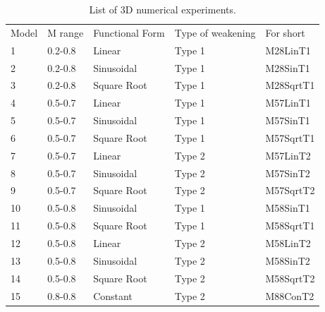 \documentclass[draft,gc]{agutex}
\begin{document}
\begin{table}
\caption{List of 3D numerical experiments.}
\centering
\begin{tabular}{l l l l l}
\hline
Model& M range & Functional Form & Type of weakening & For short \\ 
1    &  0.2-0.8    &   Linear        & Type 1   &  M28LinT1\\
2    &  0.2-0.8    &   Sinusoidal    & Type 1   &  M28SinT1\\
3    &  0.2-0.8    &   Square Root   & Type 1   &  M28SqrtT1 \\
4    &  0.5-0.7    &   Linear        & Type 1   &  M57LinT1 \\
5    &  0.5-0.7    &   Sinusoidal    & Type 1   &  M57SinT1 \\
6    &  0.5-0.7    &   Square Root    & Type 1   &  M57SqrtT1 \\
7    &  0.5-0.7    &   Linear       & Type 2   &  M57LinT2 \\
8    &  0.5-0.7    &   Sinusoidal    & Type 2   &  M57SinT2 \\
9    &  0.5-0.7    &   Square Root   & Type 2   &  M57SqrtT2  \\
10    &  0.5-0.8    &   Sinusoidal    & Type 1   &  M58SinT1  \\
11   &  0.5-0.8    &   Square Root   & Type 1   &  M58SqrtT1   \\
12    &  0.5-0.8    &   Linear        & Type 2   &  M58LinT2   \\
13    &  0.5-0.8    &   Sinusoidal    & Type 2   &  M58SinT2   \\
14   &  0.5-0.8    &   Square Root   & Type 2   &  M58SqrtT2   \\
15   &  0.8-0.8    &   Constant      & Type 2   &  M88ConT2 \\
\hline
\end{tabular}
\label{Tab1_1}
\end{table}
\end{document}
